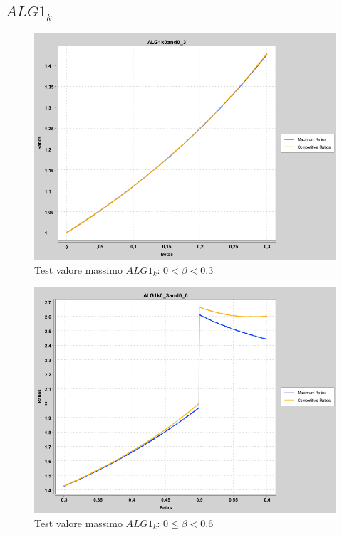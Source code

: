 \documentclass[12pt]{article}
\begin{document}
\subsection{$ALG1_{k}$}
\renewcommand{\thefigure}{\thesubsection.\arabic{figure}}
\begin{figure}[H]
\caption{Test valore massimo $ALG1_{k}$: $0 < \beta < 0.3$}
\centering
\includegraphics[scale=0.4]{max/ALG1k0and0_3.png}
\end{figure}
\begin{figure}[H]
\caption{Test valore massimo $ALG1_{k}$: $0 \leq \beta < 0.6$}
\centering
\includegraphics[scale=0.4]{max/ALG1k0_3and0_6.png}
\end{figure}
\end{document}
